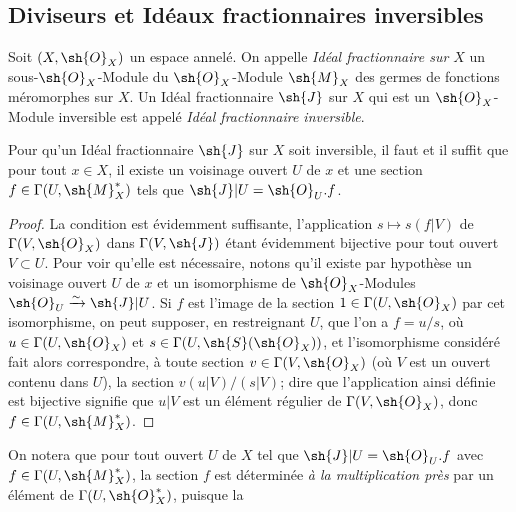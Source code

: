 \subsection{Diviseurs et Idéaux fractionnaires inversibles}

\begin{env}[21.2.1]
Soit $(X,\sh{O}_X)$ un espace annelé.
On appelle \emph{Idéal fractionnaire sur $X$} un sous-$\sh{O}_X$-Module du $\sh{O}_X$-Module $\sh{M}_X$ des germes de fonctions méromorphes sur $X$.
Un Idéal fractionnaire $\sh{J}$ sur $X$ qui est un $\sh{O}_X$-Module inversible est appelé \emph{Idéal fractionnaire inversible}.
\end{env}

\begin{proposition}[21.2.2]
\label{IV.21.2.2}
Pour qu'un Idéal fractionnaire $\sh{J}$ sur $X$ soit inversible, il faut et il suffit que pour tout $x\in X$, il existe un voisinage ouvert $U$ de $x$ et une section $f\in\Gamma(U,\sh{M}_X^*)$ tels que $\sh{J}|U=\sh{O}_U.f$.
\end{proposition}

\begin{proof}
La condition est évidemment suffisante, l'application $s\mapsto s(f|V)$ de $\Gamma(V,\sh{O}_X)$ dans $\Gamma(V,\sh{J})$ étant évidemment bijective pour tout ouvert $V\subset U$.
Pour voir qu'elle est nécessaire, notons qu'il existe par hypothèse un voisinage ouvert $U$ de $x$ et un isomorphisme de $\sh{O}_X$-Modules $\sh{O}_U\xrightarrow{\sim}\sh{J}|U$.
Si $f$ est l'image de la section $1\in\Gamma(U,\sh{O}_X)$ par cet isomorphisme, on peut supposer, en restreignant $U$, que l'on a $f=u/s$, où $u\in\Gamma(U,\sh{O}_X)$ et $s\in\Gamma(U,\sh{S}(\sh{O}_X))$, et l'isomorphisme considéré fait alors correspondre, à toute section $v\in\Gamma(V,\sh{O}_X)$ (où $V$ est un ouvert contenu dans $U$), la section $v(u|V)/(s|V)$;
dire que l'application ainsi définie est bijective signifie que $u|V$ est un élément régulier de $\Gamma(V,\sh{O}_X)$, donc $f\in\Gamma(U,\sh{M}_X^*)$.
\end{proof}

On notera que pour tout ouvert $U$ de $X$ tel que $\sh{J}|U=\sh{O}_U.f$ avec $f\in\Gamma(U,\sh{M}_X^*)$, la section $f$ est déterminée \emph{à la multiplication près} par un élément de $\Gamma(U,\sh{O}_X^*)$, puisque la
